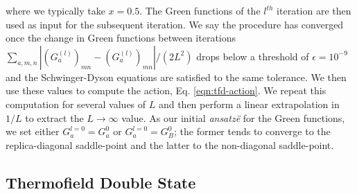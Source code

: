 \documentclass[reprint, floatfix,eqsecnum,superscriptaddress,preprint,nofootinbib,onecolumn,amsmath,amssymb,aps,prb]{revtex4-2}
\begin{document}
where we typically take $x=0.5$. The Green functions of the $l^{th}$ iteration are then used as input for the subsequent iteration. We say the procedure has converged once
the change in Green functions between iterations
    $\sum_{a,m,n} | (G_a^{(l)})_{mn} - (G_a^{(l)})_{mn}|/(2L^2)$
drops below a threshold of $\epsilon = 10^{-9}$ and the Schwinger-Dyson equations are satisfied to the same tolerance. We then use these values to compute the action, Eq. \eqref{eqn:tfd-action}. We repeat this computation for several values of $L$ and then perform a linear extrapolation in $1/L$ to extract the $L \to \infty$ value. As our initial \textit{ansatz\"e} for the Green functions, we set either $G_a^{l=0} = G_a^0$ or $G_a^{l=0} = G_B^0$; the former tends to converge to the replica-diagonal saddle-point and the latter to the non-diagonal saddle-point.

\subsection{Thermofield Double State}
\end{document}
